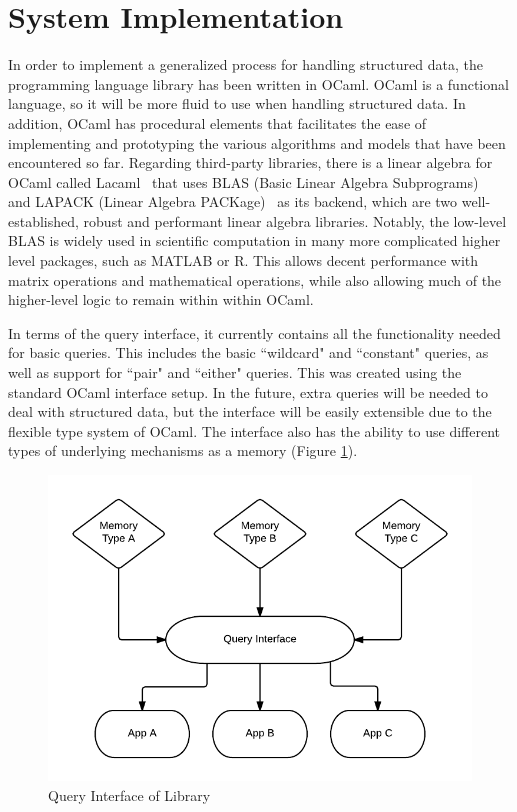 \documentclass{sig-alternate}
\begin{document}
\section{System Implementation}
\label{sec:sysimp}

In order to implement a generalized process for handling structured data, the programming language 
library has been written in OCaml. OCaml is a functional language, so it will be more fluid to use 
when handling structured data. In addition, OCaml has procedural elements that facilitates the ease 
of implementing and prototyping the various algorithms and models that have been encountered so far. 
Regarding third-party libraries, there is a linear algebra for OCaml called Lacaml~\cite{lacaml} that uses BLAS 
(Basic Linear Algebra Subprograms)~\cite{blas}
and LAPACK (Linear Algebra PACKage)~\cite{lapack}
as its backend, which are two well-established, robust and performant linear algebra 
libraries. Notably, the low-level BLAS is widely used in scientific computation in many more complicated
higher level packages, such as MATLAB or R. This allows decent performance with matrix operations
and mathematical operations, while also allowing
much of the higher-level logic to remain within within OCaml.

In terms of the query interface, it currently contains all the functionality needed for basic 
queries.  This includes the basic ``wildcard" and ``constant" queries, as well as support for 
``pair" and ``either" queries. This was created using the standard OCaml interface setup. In the 
future, extra queries will be needed to deal with structured data, but the interface will be easily 
extensible due to the flexible type system of OCaml. The interface also has the ability to use 
different types of underlying mechanisms as a memory (Figure \ref{fig:queryint}).

\begin{figure}[h]
	\begin{center}
		\includegraphics[width=1\linewidth]{queryint}
	\end{center}
	\vspace{-12pt}
	\caption{Query Interface of Library}
	\label{fig:queryint}
\end{figure}
\end{document}
